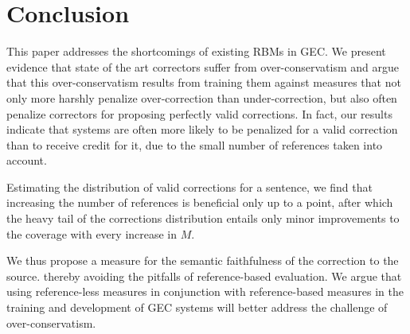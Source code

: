 \documentclass[letterpaper, 11pt]{article}
\begin{document}
%
%
%
\section{Conclusion}

This paper addresses the shortcomings of existing RBMs in GEC.
We present evidence that state of the art correctors suffer from over-conservatism and
argue that this over-conservatism results from training them against measures that
not only more harshly penalize over-correction than under-correction,
but also often penalize correctors for proposing perfectly valid corrections.
In fact, our results indicate that systems are often more likely to be penalized for a valid correction
than to receive credit for it, due to the small number of references taken into account.

Estimating the distribution of valid corrections for a sentence, we find
that increasing the number of references is beneficial only up to a point, after which
the heavy tail of the corrections distribution entails only minor improvements to the coverage
with every increase in $M$.

We thus propose a measure for the semantic faithfulness of the correction to the source.
thereby avoiding the pitfalls of reference-based evaluation. We argue that using reference-less
measures in conjunction with reference-based measures in the training and development of GEC
systems will better address the challenge of over-conservatism.
\end{document}
